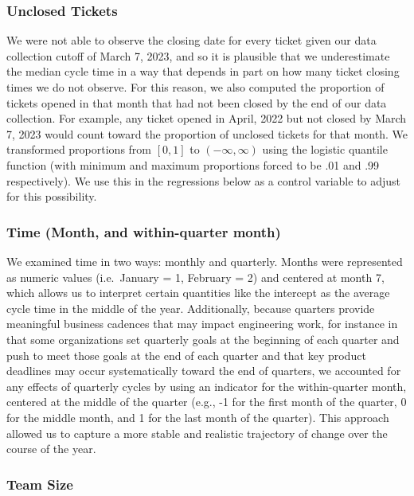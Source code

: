 \documentclass[
]{article}
\begin{document}
\subsubsection{Unclosed Tickets}\label{unclosed-tickets}

We were not able to observe the closing date for every ticket given our
data collection cutoff of March 7, 2023, and so it is plausible that we
underestimate the median cycle time in a way that depends in part on how
many ticket closing times we do not observe. For this reason, we also
computed the proportion of tickets opened in that month that had not
been closed by the end of our data collection. For example, any ticket
opened in April, 2022 but not closed by March 7, 2023 would count toward
the proportion of unclosed tickets for that month. We transformed
proportions from \([0,1]\) to \((-\infty, \infty)\) using the logistic
quantile function (with minimum and maximum proportions forced to be .01
and .99 respectively). We use this in the regressions below as a control
variable to adjust for this possibility.

\subsubsection{Time (Month, and within-quarter
month)}\label{time-month-and-within-quarter-month}

We examined time in two ways: monthly and quarterly. Months were
represented as numeric values (i.e.~January = 1, February = 2) and
centered at month 7, which allows us to interpret certain quantities
like the intercept as the average cycle time in the middle of the year.
Additionally, because quarters provide meaningful business cadences that
may impact engineering work, for instance in that some organizations set
quarterly goals at the beginning of each quarter and push to meet those
goals at the end of each quarter and that key product deadlines may
occur systematically toward the end of quarters, we accounted for any
effects of quarterly cycles by using an indicator for the within-quarter
month, centered at the middle of the quarter (e.g., -1 for the first
month of the quarter, 0 for the middle month, and 1 for the last month
of the quarter). This approach allowed us to capture a more stable and
realistic trajectory of change over the course of the year.

\subsubsection{Team Size}\label{team-size}
\end{document}
